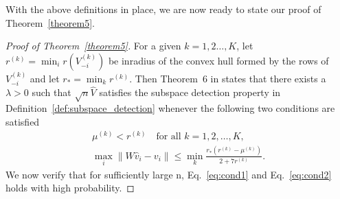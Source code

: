 \documentclass[12pt]{article}
\begin{document}

With the above definitions in place, we are now ready to state our
proof of Theorem~\ref{theorem5}.

\begin{proof}[Proof of Theorem~\ref{theorem5}]
For a given $k = 1,2\dots,K$, let $r^{(k)} = \min_{i}r(V_{-i}^{(k)})$ be inradius of the convex hull formed by
the rows of $V_{-i}^{(k)}$ and let $r_* = \min_{k} r^{(k)}$. Then Theorem~6 in
\citeauthor{jmlr-v28-wang13} states that there exists a $\lambda > 0$
such that $\sqrt{n} \hat{V}$ satisfies
the subspace detection property in
Definition~\ref{def:subspace_detection} whenever
the following two conditions are satisfied
\begin{gather}
  \label{eq:cond1}
  \mu^{(k)} < r^{(k)} \quad \text{for all $k = 1,2,\dots,K$}, \\
  \label{eq:cond2}
  \max_{i} \|W \hat{v}_{i} - v_{i}\| \leq \min_{k} \frac{r_*(r^{(k)} -
    \mu^{(k)})}{2 + 7 r^{(k)}}.
\end{gather}
We now verify that for sufficiently large n, Eq.~\eqref{eq:cond1} and Eq.~\eqref{eq:cond2}
holds with high probability.


\end{proof}
\end{document}
